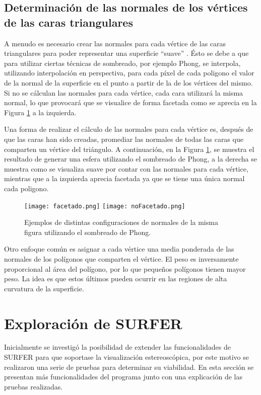 \documentclass[12pt]{article}
\begin{document}
\subsection{Determinación de las normales de los vértices de las caras triangulares}
\noindent A menudo es necesario crear las normales para cada vértice de las caras triangulares para poder representar una superficie “suave” \cite{realtimerendering}. Ésto se debe a que para utilizar ciertas técnicas de sombreado, por ejemplo Phong, se interpola, utilizando interpolación en perspectiva, para cada píxel de cada poligono el valor de la normal de la superficie en el punto a partir de la de los vértices del mismo. Si no se cálculan las normales para cada vértice, cada cara utilizará la misma normal, lo que provocará que se visualice de forma facetada como se aprecia en la Figura \ref{normales} a la izquierda.

Una forma de realizar el cálculo de las normales para cada vértice es, después de que las caras han sido creadas, promediar las normales de todas las caras que comparten un vértice del triángulo. A continuación, en la Figura \ref{normales}, se muestra el resultado de generar una esfera utilizando el sombreado de Phong\cite{realtimerendering}, a la derecha se muestra como se visualiza suave por contar con las normales para cada vértice, mientras que a la izquierda aprecia facetada ya que se tiene una única normal cada poligono.
\begin{figure}[h]
\texttt{[image: facetado.png]}
\hfill
\texttt{[image: noFacetado.png]}
\caption{ Ejemplos de distintas configuraciones de normales de la misma figura utilizando el sombreado de Phong.}
\label{normales}
\end{figure}

Otro enfoque común es asignar a cada vértice una media ponderada de las normales de los polígonos que comparten el vértice. El peso es  inversamente proporcional al área del polígono, por lo que pequeños polígonos tienen mayor peso. La idea es que estos últimos pueden ocurrir en las regiones de alta curvatura de la superficie.

\clearpage
\section{Exploración de SURFER}
\noindent Inicialmente se investigó la posibilidad de extender las funcionalidades de SURFER para que soportase la visualización estereoscópica, por este motivo se realizaron una serie de pruebas para determinar su viabilidad. En esta sección se presentan más funcionalidades del programa junto con una explicación de las pruebas realizadas.
\end{document}
